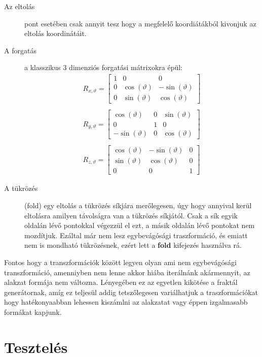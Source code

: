 \begin{description}
	\item[Az eltolás] pont esetében csak annyit tesz hogy a megfelelő koordiátákból kivonjuk az eltolás koordinátáit.
	\item[A forgatás] a klasszikus 3 dimenziós forgatási mátrixokra épül:
$$\begin{array}{l}
R_{x, \vartheta}=\left[\begin{array}{ccc}
1 & 0 & 0 \\
0 & \cos (\vartheta) & -\sin (\vartheta) \\
0 & \sin (\vartheta) & \cos (\vartheta)
\end{array}\right] \\
\\
R_{y, \vartheta}=\left[\begin{array}{ccc}
\cos (\vartheta) & 0 & \sin (\vartheta) \\
0 & 1 & 0 \\
-\sin (\vartheta) & 0 & \cos (\vartheta)
\end{array}\right] \\
\\
R_{z, \vartheta}=\left[\begin{array}{ccc}
\cos (\vartheta) & -\sin (\vartheta) & 0 \\
\sin (\vartheta) & \cos (\vartheta) & 0 \\
0 & 0 & 1
\end{array}\right]
\end{array}$$
	\item[A tükrözés] (fold) egy eltolás a tükrözés síkjára merőlegesen, úgy hogy annyival kerül eltolásra amilyen távolságra van a tükrözés síkjától. Csak a sík egyik oldalán lévő pontokkal végezzül el ezt, a másik oldalán lévő pontokat nem mozdítjuk. Ezáltal már nem lesz egybevágósági traszformáció, és emiatt nem is mondható tükrözésnek, ezért lett a \textbf{fold} kifejezés használva rá.
\end{description}

Fontos hogy a transzformációk között legyen olyan ami nem egybevágósági transzformáció, amenniyben nem lenne akkor hiába iterálnánk akármennyit, az alakzat formája nem változna. Lényegében ez az egyetlen kikötése a fraktál generátornak, amíg ez teljesül addig tetszőlegesen variálhatjuk a traszformációkat hogy hatékonyaabban lehessen kiszámlni az alakzatat vagy éppen izgalmasabb formákat kapjunk.

\section{Tesztelés}

